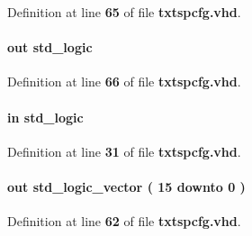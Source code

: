 Definition at line {\bf 65} of file {\bf txtspcfg.\+vhd}.

\paragraph[{lms\+\_\+ss}]{ {\bfseries \textcolor{keywordflow}{out}\textcolor{vhdlchar}{ }} {\bfseries \textcolor{comment}{std\+\_\+logic}\textcolor{vhdlchar}{ }} \hspace{0.3cm}{\ttfamily [Port]}}\label{classtxtspcfg_ab1e0c82365bf86e984eadfdb35e80a29}


Definition at line {\bf 66} of file {\bf txtspcfg.\+vhd}.

\paragraph[{lreset}]{ {\bfseries \textcolor{keywordflow}{in}\textcolor{vhdlchar}{ }} {\bfseries \textcolor{comment}{std\+\_\+logic}\textcolor{vhdlchar}{ }} \hspace{0.3cm}{\ttfamily [Port]}}\label{classtxtspcfg_ab4573fdea1cdc3308c947af523ca0d97}


Definition at line {\bf 31} of file {\bf txtspcfg.\+vhd}.

\paragraph[{lte\+\_\+ch\+\_\+en}]{ {\bfseries \textcolor{keywordflow}{out}\textcolor{vhdlchar}{ }} {\bfseries \textcolor{comment}{std\+\_\+logic\+\_\+vector}\textcolor{vhdlchar}{ }\textcolor{vhdlchar}{(}\textcolor{vhdlchar}{ }\textcolor{vhdlchar}{ } \textcolor{vhdldigit}{15} \textcolor{vhdlchar}{ }\textcolor{keywordflow}{downto}\textcolor{vhdlchar}{ }\textcolor{vhdlchar}{ } \textcolor{vhdldigit}{0} \textcolor{vhdlchar}{ }\textcolor{vhdlchar}{)}\textcolor{vhdlchar}{ }} \hspace{0.3cm}{\ttfamily [Port]}}\label{classtxtspcfg_adeea79081adedbbe36bf636377661365}


Definition at line {\bf 62} of file {\bf txtspcfg.\+vhd}.


